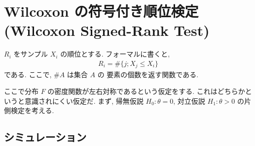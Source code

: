 \documentclass[12pt]{jsarticle}
\begin{document}
\section{Wilcoxon の符号付き順位検定(Wilcoxon Signed-Rank Test)}

$R_i$ をサンプル $X_i$ の順位とする.
フォーマルに書くと,
\begin{align}
R_i = \#\{j;X_j \le X_i\}
\end{align}
である. ここで, $\#A$ は集合 $A$ の 要素の個数を返す関数である.

ここで分布 $F$ の密度関数が左右対称であるという仮定をする. これはどちらかというと意識されにくい仮定だ.
まず, 帰無仮説 $H_0: \theta = 0$, 対立仮説 $H_1: \theta > 0$ の片側検定を考える.

\subsection{シミュレーション}
\end{document}
